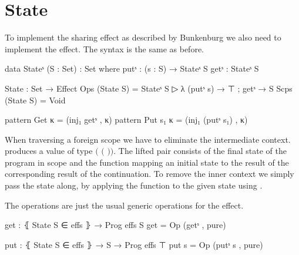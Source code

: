 \section{State}
\label{scoped-algebra:state}

To implement the sharing effect as described by Bunkenburg we also need to
implement the  effect.
The syntax is the same as before.

\begin{code}
data Stateˢ (S : Set) : Set where
  putˢ : (s : S) → Stateˢ S
  getˢ : Stateˢ S

State : Set → Effect
Ops   (State S) = Stateˢ S ▷ λ{ (putˢ s) → ⊤ ; getˢ → S }
Scps  (State S) = Void

pattern Get κ     = (inj₁ getˢ , κ)
pattern Put s₁ κ  = (inj₁ (putˢ s₁) , κ)
\end{code}
When traversing a foreign scope we have to eliminate the intermediate context.
 produces a value of type
\AgdaSpace{}\AgdaSpace{}$($%
\AgdaSpace{}\AgdaSpace{}$($%
\AgdaSpace{}\AgdaSpace{}%
\AgdaSpace{}\AgdaSpace{}$)$$)$.
The lifted pair consists of the final state of the program in scope and the
function mapping an initial state to the result of the corresponding result of
the continuation.
To remove the inner context we simply pass the state along, by applying the
function to the given state using .

The operations are just the usual generic operations for the effect.

\begin{code}
get : ⦃ State S ∈ effs ⦄ → Prog effs S
get = Op (getˢ , pure)

put : ⦃ State S ∈ effs ⦄ → S → Prog effs ⊤
put s = Op (putˢ s , pure)
\end{code}


